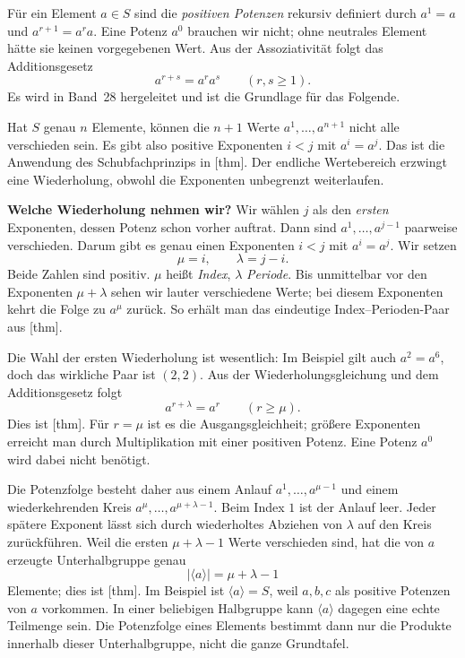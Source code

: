Für ein Element \(a\in S\) sind die \emph{positiven Potenzen} rekursiv
definiert durch \(a^1=a\) und \(a^{r+1}=a^ra\).
Eine Potenz \(a^0\) brauchen wir nicht; ohne neutrales Element hätte sie
keinen vorgegebenen Wert. Aus der Assoziativität folgt das Additionsgesetz
\[
  a^{r+s}=a^ra^s\qquad(r,s\geq1).
\]
Es wird in Band~28 hergeleitet und ist die Grundlage für das Folgende.

Hat \(S\) genau \(n\) Elemente, können die \(n+1\) Werte
\(a^1,\ldots,a^{n+1}\) nicht alle verschieden sein. Es gibt also
positive Exponenten \(i<j\) mit \(a^i=a^j\). Das ist die Anwendung des
Schubfachprinzips in
[thm].
Der endliche Wertebereich erzwingt eine Wiederholung, obwohl die
Exponenten unbegrenzt weiterlaufen.

\medskip\noindent\textbf{Welche Wiederholung nehmen wir?}
Wir wählen \(j\) als den \emph{ersten} Exponenten, dessen Potenz schon
vorher auftrat. Dann sind \(a^1,\ldots,a^{j-1}\) paarweise verschieden.
Darum gibt es genau einen Exponenten \(i<j\) mit \(a^i=a^j\).
Wir setzen
\[
  \mu=i,\qquad \lambda=j-i.
\]
Beide Zahlen sind positiv. \(\mu\) heißt \emph{Index}, \(\lambda\)
\emph{Periode}. Bis unmittelbar vor den Exponenten \(\mu+\lambda\)
sehen wir lauter verschiedene Werte; bei diesem Exponenten kehrt die
Folge zu \(a^\mu\) zurück. So erhält man das eindeutige
Index--Perioden-Paar aus
[thm].

Die Wahl der ersten Wiederholung ist wesentlich: Im Beispiel gilt
auch \(a^2=a^6\), doch das wirkliche Paar ist \((2,2)\).
Aus der Wiederholungsgleichung und dem Additionsgesetz folgt
\[
  a^{r+\lambda}=a^r\qquad(r\geq\mu).
\]
Dies ist [thm].
Für \(r=\mu\) ist es die Ausgangsgleichheit; größere Exponenten
erreicht man durch Multiplikation mit einer positiven Potenz.
Eine Potenz \(a^0\) wird dabei nicht benötigt.

Die Potenzfolge besteht daher aus einem Anlauf
\(a^1,\ldots,a^{\mu-1}\) und einem wiederkehrenden Kreis
\(a^\mu,\ldots,a^{\mu+\lambda-1}\). Beim Index \(1\) ist der Anlauf
leer. Jeder spätere Exponent lässt sich durch wiederholtes Abziehen
von \(\lambda\) auf den Kreis zurückführen. Weil die ersten
\(\mu+\lambda-1\) Werte verschieden sind, hat die von \(a\) erzeugte
Unterhalbgruppe genau
\[
  |\langle a\rangle|=\mu+\lambda-1
\]
Elemente; dies ist [thm].
Im Beispiel ist \(\langle a\rangle=S\), weil \(a,b,c\) als positive
Potenzen von \(a\) vorkommen. In einer beliebigen Halbgruppe kann
\(\langle a\rangle\) dagegen eine echte Teilmenge sein. Die Potenzfolge
eines Elements bestimmt dann nur die Produkte innerhalb dieser
Unterhalbgruppe, nicht die ganze Grundtafel.

